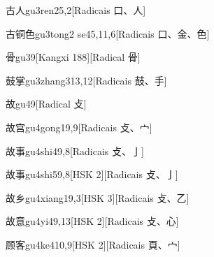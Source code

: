 \begin{entry}{古人}{gu3ren2}{5,2}[Radicais ⼝、⼈]
\end{entry}

\begin{entry}{古铜色}{gu3tong2 se4}{5,11,6}[Radicais ⼝、⾦、⾊]
\end{entry}

\begin{entry}{骨}{gu3}{9}[Kangxi 188][Radical ⾻]
\end{entry}

\begin{entry}{鼓掌}{gu3zhang3}{13,12}[Radicais ⿎、⼿]
\end{entry}

\begin{entry}{故}{gu4}{9}[Radical ⽁]
\end{entry}

\begin{entry}{故宫}{gu4gong1}{9,9}[Radicais ⽁、⼧]
\end{entry}

\begin{entry}{故事}{gu4shi4}{9,8}[Radicais ⽁、⼅]
\end{entry}

\begin{entry}{故事}{gu4shi5}{9,8}[HSK 2][Radicais ⽁、⼅]
\end{entry}

\begin{entry}{故乡}{gu4xiang1}{9,3}[HSK 3][Radicais ⽁、⼄]
\end{entry}

\begin{entry}{故意}{gu4yi4}{9,13}[HSK 2][Radicais ⽁、⼼]
\end{entry}

\begin{entry}{顾客}{gu4ke4}{10,9}[HSK 2][Radicais ⾴、⼧]
\end{entry}

